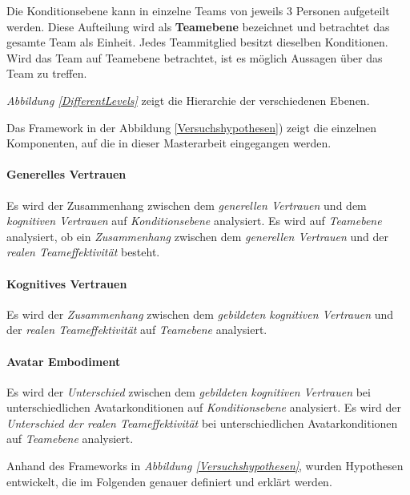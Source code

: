 \documentclass[a4paper,11pt]{article}%
\renewcommand{\\}{\vspace*{0.5\baselineskip} \newline}
\begin{document}
Die Konditionsebene kann in einzelne Teams von jeweils 3 Personen aufgeteilt werden. Diese Aufteilung wird als \textbf{Teamebene} bezeichnet und betrachtet das gesamte Team als Einheit. Jedes Teammitglied besitzt dieselben Konditionen. Wird das Team auf Teamebene betrachtet, ist es möglich Aussagen über das Team zu treffen. 

\textit{Abbildung \ref{DifferentLevels}} zeigt die Hierarchie der verschiedenen Ebenen.

Das Framework in der Abbildung \ref{Versuchshypothesen}) zeigt die einzelnen Komponenten, auf die in dieser Masterarbeit eingegangen werden. 

\paragraph{Generelles Vertrauen}
Es wird der Zusammenhang zwischen dem \textit{generellen Vertrauen} und dem \textit{kognitiven Vertrauen} auf \textit{Konditionsebene} analysiert.
Es wird auf \textit{Teamebene} analysiert, ob ein \textit{Zusammenhang} zwischen dem \textit{generellen Vertrauen} und der  \textit{realen Teameffektivität} besteht.

\paragraph{Kognitives Vertrauen}
Es wird der \textit{Zusammenhang} zwischen dem \textit{gebildeten kognitiven Vertrauen} und der \textit{realen Teameffektivität} auf \textit{Teamebene} analysiert.

\paragraph{Avatar Embodiment}
Es wird der \textit{Unterschied} zwischen dem \textit{gebildeten kognitiven Vertrauen} bei unterschiedlichen Avatarkonditionen auf \textit{Konditionsebene} analysiert.
Es wird der \textit{Unterschied} \textit{der realen Teameffektivität} bei unterschiedlichen Avatarkonditionen auf \textit{Teamebene} analysiert.

Anhand des Frameworks in \textit{Abbildung \ref{Versuchshypothesen}}, wurden Hypothesen entwickelt, die im Folgenden genauer definiert und erklärt werden.
\end{document}

